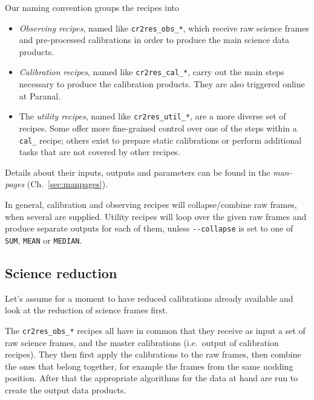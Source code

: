Our naming convention groups the recipes into
\begin{itemize}
    \item \textit{Observing recipes}, named like \texttt{cr2res\_obs\_*}, which
    receive raw science frames and pre-processed calibrations in order to
    produce the main science data products.
    \item \textit{Calibration recipes}, named like \texttt{cr2res\_cal\_*},
    carry out the main steps necessary to produce the calibration products. They
    are also triggered online at Paranal.
    \item The \textit{utility recipes}, named like \texttt{cr2res\_util\_*}, are
    a more diverse set of recipes. Some offer more fine-grained control over one
    of the steps within a \texttt{cal\_} recipe; others exist to prepare static
    calibrations or perform additional tasks that are not covered by other
    recipes.
\end{itemize}

Details about their inputs, outputs and parameters can be found in the
\emph{man-pages} (Ch.~\ref{sec:manpages}).

In general, calibration and observing recipes will collapse/combine raw frames,
when several are supplied. Utility recipes will loop over the given raw frames
and produce separate outputs for each of them, unless \verb!--collapse! is
set to one of \verb!SUM!, \verb!MEAN! or \verb!MEDIAN!.




\subsection{Science reduction}
\label{sec:sci-reduc}
Let's assume for a moment to have reduced calibrations already available
and look at the reduction of science frames first.

The \texttt{cr2res\_obs\_*} recipes all have in common that they receive as
input a set of raw science frames, and the master calibrations (i.e.~output of
calibration recipes). They then first apply the calibrations to the raw frames,
then combine the ones that belong together, for example the frames from the same
nodding position. After that the appropriate algorithms for the data at hand are
run to create the output data products.

